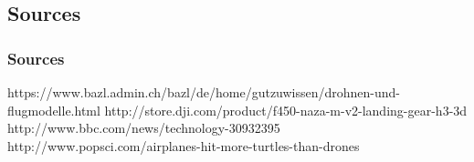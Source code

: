 \subsection{Sources}

\begin{frame}
\frametitle{Sources}

\begin{small}
https://www.bazl.admin.ch/bazl/de/home/gutzuwissen/drohnen-und-flugmodelle.html
http://store.dji.com/product/f450-naza-m-v2-landing-gear-h3-3d
http://www.bbc.com/news/technology-30932395
http://www.popsci.com/airplanes-hit-more-turtles-than-drones


\end{small}

  
\end{frame}





